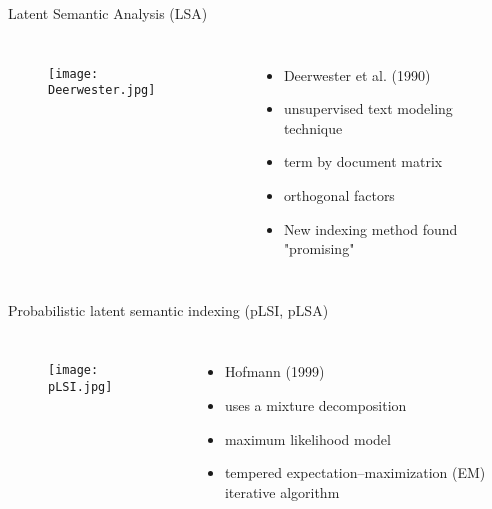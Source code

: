 \documentclass{beamer}
\begin{document}
\begin{frame}{Latent Semantic Analysis (LSA)}
\begin{columns}
\begin{figure}[htb!]
\texttt{[image: Deerwester.jpg]}
\end{figure}

\begin{itemize}
\item Deerwester et al. (1990) \\
\item unsupervised text modeling technique
\item term by document matrix 
\item orthogonal factors 
\item New indexing method found "promising" 
\end{itemize}
\end{columns}
\end{frame}

\begin{frame}{Probabilistic latent semantic indexing (pLSI, pLSA)}
\begin{columns}
\begin{figure}[htb!]
\texttt{[image: pLSI.jpg]}
\end{figure}
\begin{itemize}
\item Hofmann (1999)
\item uses a mixture decomposition
\item maximum likelihood model
\item tempered expectation–maximization (EM) iterative algorithm 
\end{itemize}
\end{columns}
\end{frame}
\end{document}
